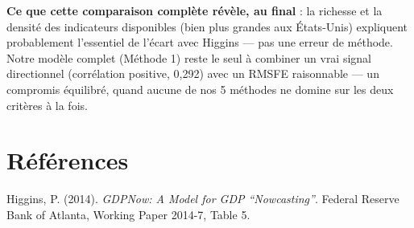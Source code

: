 \documentclass[11pt,a4paper]{article}
\begin{document}
\begin{resultatbox}
\textbf{Ce que cette comparaison complète révèle, au final} : la richesse et la densité des indicateurs disponibles (bien plus grandes aux États-Unis) expliquent probablement l'essentiel de l'écart avec Higgins --- pas une erreur de méthode. Notre modèle complet (Méthode 1) reste le seul à combiner un vrai signal directionnel (corrélation positive, 0,292) avec un RMSFE raisonnable --- un compromis équilibré, quand aucune de nos 5 méthodes ne domine sur les deux critères à la fois.
\end{resultatbox}

\section*{Références}
\begin{enumerate}[leftmargin=1.6em, label=\textbf{[\arabic*]}]
\item \hypertarget{ref1}{} Higgins, P. (2014). \textit{GDPNow: A Model for GDP ``Nowcasting''}. Federal Reserve Bank of Atlanta, Working Paper 2014-7, Table 5.
\end{enumerate}
\end{document}

